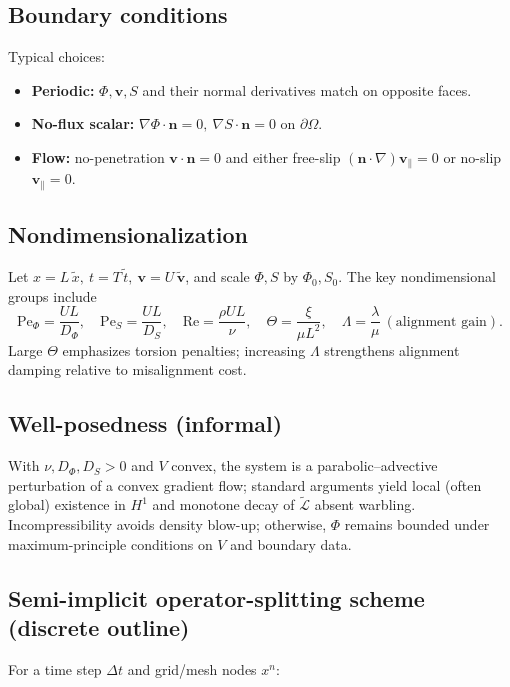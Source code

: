 \documentclass[a4paper,11pt]{article}
\begin{document}
\subsection{Boundary conditions}
Typical choices:
\begin{itemize}
\item \textbf{Periodic:} \(\Phi,\mathbf{v},S\) and their normal derivatives match on opposite faces.
\item \textbf{No-flux scalar:} \(\nabla\Phi\!\cdot\!\mathbf{n}=0,\ \nabla S\!\cdot\!\mathbf{n}=0\) on \(\partial\Omega\).
\item \textbf{Flow:} no-penetration \(\mathbf{v}\!\cdot\!\mathbf{n}=0\) and either free-slip
\((\mathbf{n}\!\cdot\!\nabla)\mathbf{v}_\parallel=0\) or no-slip \(\mathbf{v}_\parallel=0\).
\end{itemize}

\subsection{Nondimensionalization}
Let \(x=L\,\tilde{x},\ t=T\,\tilde{t},\ \mathbf{v}=U\,\tilde{\mathbf{v}}\), and scale
\(\Phi,S\) by \(\Phi_0,S_0\). The key nondimensional groups include
\[
\mathrm{Pe}_\Phi=\frac{UL}{D_\Phi},\quad
\mathrm{Pe}_S=\frac{UL}{D_S},\quad
\mathrm{Re}=\frac{\rho UL}{\nu},\quad
\Theta=\frac{\xi}{\mu L^2},\quad
\Lambda=\frac{\lambda}{\mu}\ (\text{alignment gain}).
\]
Large \(\Theta\) emphasizes torsion penalties; increasing \(\Lambda\) strengthens
alignment damping relative to misalignment cost.

\subsection{Well-posedness (informal)}
With \(\nu,D_\Phi,D_S>0\) and \(V\) convex, the system is a
parabolic–advective perturbation of a convex gradient flow; standard arguments
yield local (often global) existence in \(H^1\) and monotone decay of
\(\widetilde{\mathcal{L}}\) absent warbling. Incompressibility avoids density
blow-up; otherwise, \(\Phi\) remains bounded under maximum-principle conditions
on \(V\) and boundary data.

\subsection{Semi-implicit operator-splitting scheme (discrete outline)}
For a time step \(\Delta t\) and grid/mesh nodes \(x^n\):
\end{document}
